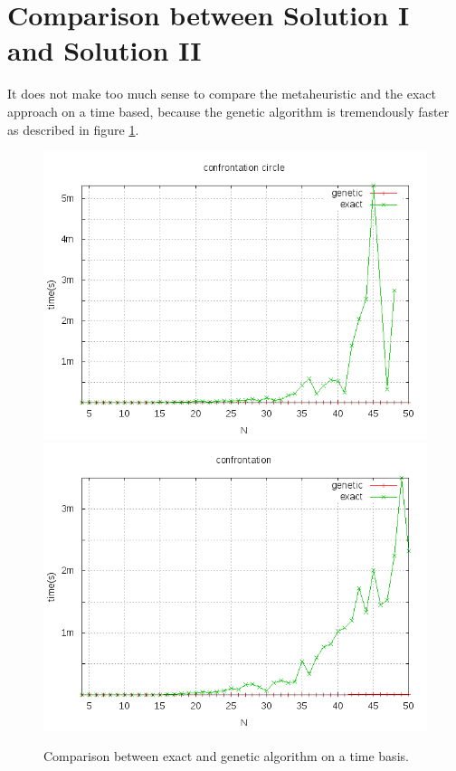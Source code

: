 \newpage
\section{Comparison between Solution I and Solution II}
It does not make too much sense to compare the metaheuristic and the
exact approach on a time based, because the genetic algorithm is tremendously faster
as described in figure \ref{fig:comparison}.


\begin{figure}
	\centering
	\includegraphics[scale=0.42]{img/confronto_circle_exact_genetic.png}
	\includegraphics[scale=0.42]{img/confronto_random_exact_genetic.png}
	\caption{Comparison between exact and genetic algorithm on a time basis.}
	\label{fig:comparison}
\end{figure}



